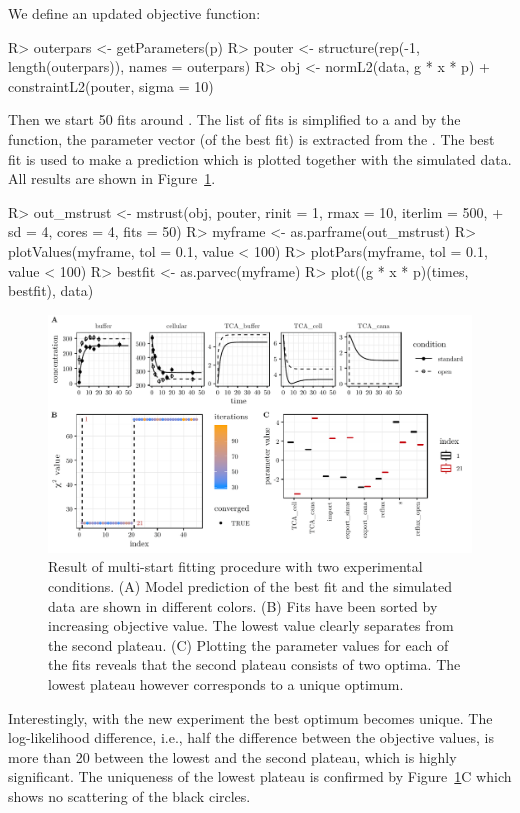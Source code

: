 \documentclass[article]{jss}
\begin{document}
We define an updated objective function:
\begin{CodeChunk}
\begin{CodeInput}
R> outerpars <- getParameters(p)
R> pouter <- structure(rep(-1, length(outerpars)), names = outerpars)
R> obj <- normL2(data, g * x * p) + constraintL2(pouter, sigma = 10)
\end{CodeInput}
\end{CodeChunk}
%
Then we start 50 fits around . The list of fits is simplified to a  and by the  function, the parameter vector (of the best fit) is extracted from the . The best fit is used to make a prediction which is plotted together with the simulated data. All results are shown in Figure~\ref{fig:twoconditions}.
%
\begin{CodeChunk}
\begin{CodeInput}
R> out_mstrust <- mstrust(obj, pouter, rinit = 1, rmax = 10, iterlim = 500,
+    sd = 4, cores = 4, fits = 50)
R> myframe <- as.parframe(out_mstrust)
R> plotValues(myframe, tol = 0.1, value < 100)
R> plotPars(myframe, tol = 0.1, value < 100)
R> bestfit <- as.parvec(myframe)
R> plot((g * x * p)(times, bestfit), data)
\end{CodeInput}
\end{CodeChunk}
%
\begin{figure}[t!]
\centering
\includegraphics[width = \textwidth]{Figures/figure6}
\caption{Result of multi-start fitting procedure with two experimental conditions. (A) Model prediction of the best fit and the simulated data are shown in different colors. (B) Fits have been sorted by increasing objective value. The lowest value clearly separates from the second plateau. (C) Plotting the parameter values for each of the fits reveals that the second plateau consists of two optima. The lowest plateau however corresponds to a unique optimum.}
\label{fig:twoconditions}
\end{figure}
%
Interestingly, with the new experiment the best optimum becomes unique. The log-likelihood difference, i.e., half the difference between the objective values, is more than 20 between the lowest and the second plateau, which is highly significant. The uniqueness of the lowest plateau is confirmed by Figure~\ref{fig:twoconditions}C which shows no scattering of the black circles.
\end{document}
